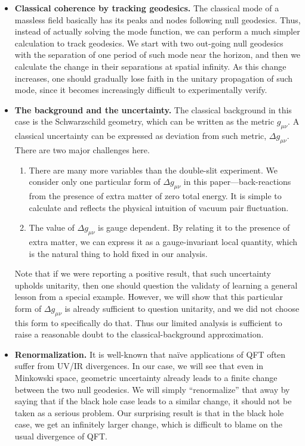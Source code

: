 \documentclass[aps,showpacs,onecolumn,floats,prd,superscriptaddress,nofootinbib]{revtex4-1}
\begin{document}
\begin{itemize}
\item {\bf Classical coherence by tracking geodesics.} The classical mode of a massless field basically has its peaks and nodes following null geodesics.
Thus, instead of actually solving the mode function, we can perform a much simpler calculation to track geodesics.
We start with two out-going null geodesics with the separation of one period of such mode near the horizon, and then we calculate the change in their separations at spatial infinity.
As this change increases, one should gradually lose faith in the unitary propagation of such mode, since it becomes increasingly difficult to experimentally verify.
\item {\bf The background and the uncertainty.} The classical background in this case is the Schwarzschild geometry, which can be written as the metric $g_{\mu\nu}$. 
A classical uncertainty can be expressed as deviation from such metric, $\Delta g_{\mu\nu}$. 
There are two major challenges here.
\begin{enumerate}
\item There are many more variables than the double-slit experiment. 
We consider only one particular form of $\Delta g_{\mu\nu}$ in this paper---back-reactions from the presence of extra matter of zero total energy. 
It is simple to calculate and reflects the physical intuition of vacuum pair fluctuation.
\item The value of $\Delta g_{\mu\nu}$ is gauge dependent. 
By relating it to the presence of extra matter, we can express it as a gauge-invariant local quantity, which is the natural thing to hold fixed in our analysis.
\end{enumerate}
Note that if we were reporting a positive result, that such uncertainty upholds unitarity, then one should question the validaty of learning a general lesson from a special example. However, we will show that this particular form of $\Delta g_{\mu\nu}$ is already sufficient to question unitarity, and we did not choose this form to specifically do that. Thus our limited analysis is sufficient to raise a reasonable doubt to the classical-background approximation.
\item {\bf Renormalization.} It is well-known that na\"ive applications of QFT often suffer from UV/IR divergences.
In our case, we will see that even in Minkowski space, geometric uncertainty already leads to a finite change between the two null geodesics.
We will simply ``renormalize'' that away by saying that if the black hole case leads to a similar change, it should not be taken as a serious problem.
Our surprising result is that in the black hole case, we get an infinitely larger change, which is difficult to blame on the usual divergence of QFT.
\end{itemize}
\end{document}
